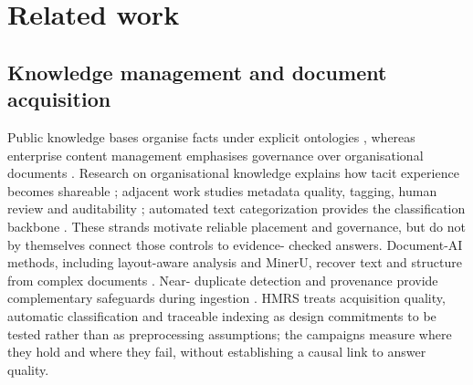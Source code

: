 \section{Related work}
\label{sec:related}

\subsection{Knowledge management and document acquisition}
Public knowledge bases organise facts under explicit ontologies
\citep{auer-dbpedia-kb-2007,hoffart-yago2-kb-2013}, whereas enterprise content
management emphasises governance over organisational documents
\citep{paivarinta-ecm-2005,tyrvaainen-ecm-2006}. Research on organisational
knowledge explains how tacit experience becomes shareable
\citep{nonaka-seci-1994,nonaka-seci-ba-2000}; adjacent work studies metadata
quality, tagging, human review and auditability
\citep{park-metadata-quality-2009,golder-tagging-2006,mosqueira-rey-hitl-2022,barredo-arrieta-xai-2020}; automated text categorization provides the classification backbone \citep{sebastiani2002machine}. These strands motivate reliable placement
and governance, but do not by themselves connect those controls to evidence-
checked answers. Document-AI methods, including layout-aware analysis and
MinerU, recover text and structure from complex documents
\citep{zhong-publaynet-layout-2019,huang-layoutlmv3-docai-2022,mineru}. Near-
duplicate detection and provenance provide complementary safeguards during
ingestion \citep{manku-near-dup-2007,missier-prov-2013,cheney-provenance-2009}.
HMRS treats acquisition quality, automatic classification and traceable
indexing as design commitments to be tested rather than as preprocessing
assumptions; the campaigns measure where they hold and where they fail,
without establishing a causal link to answer quality.

